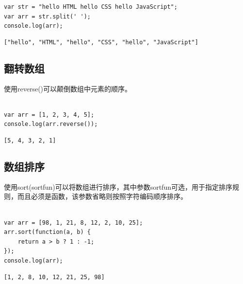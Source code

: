 \begin{lstlisting}[style=htmlcssjs]
var str = "hello HTML hello CSS hello JavaScript";
var arr = str.split(' ');
console.log(arr);
\end{lstlisting}

\begin{tcolorbox}
	\begin{verbatim}
["hello", "HTML", "hello", "CSS", "hello", "JavaScript"]
	\end{verbatim}
\end{tcolorbox}

\subsection{翻转数组}

使用reverse()可以颠倒数组中元素的顺序。 \\

 \\

\begin{lstlisting}[style=htmlcssjs]
var arr = [1, 2, 3, 4, 5];
console.log(arr.reverse());
\end{lstlisting}

\begin{tcolorbox}
	\begin{verbatim}
[5, 4, 3, 2, 1]
	\end{verbatim}
\end{tcolorbox}

\subsection{数组排序}

使用sort(sortfun)可以将数组进行排序，其中参数sortfun可选，用于指定排序规则，而且必须是函数，该参数省略则按照字符编码顺序排序。 \\

 \\

\begin{lstlisting}[style=htmlcssjs]
var arr = [98, 1, 21, 8, 12, 2, 10, 25];
arr.sort(function(a, b) {
    return a > b ? 1 : -1;
});
console.log(arr);
\end{lstlisting}

\begin{tcolorbox}
	\begin{verbatim}
[1, 2, 8, 10, 12, 21, 25, 98]
	\end{verbatim}
\end{tcolorbox}

